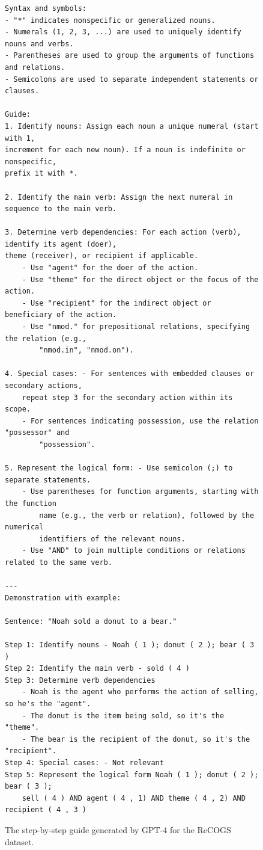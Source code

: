 \documentclass[11pt]{article}
\begin{document}
    \begin{figure}
        \small
        \begin{verbatim}
Syntax and symbols:
- "*" indicates nonspecific or generalized nouns.
- Numerals (1, 2, 3, ...) are used to uniquely identify nouns and verbs.
- Parentheses are used to group the arguments of functions and relations.
- Semicolons are used to separate independent statements or clauses.

Guide:
1. Identify nouns: Assign each noun a unique numeral (start with 1,
increment for each new noun). If a noun is indefinite or nonspecific,
prefix it with *.

2. Identify the main verb: Assign the next numeral in sequence to the main verb.

3. Determine verb dependencies: For each action (verb), identify its agent (doer),
theme (receiver), or recipient if applicable.
    - Use "agent" for the doer of the action.
    - Use "theme" for the direct object or the focus of the action.
    - Use "recipient" for the indirect object or beneficiary of the action.
    - Use "nmod." for prepositional relations, specifying the relation (e.g.,
        "nmod.in", "nmod.on").

4. Special cases: - For sentences with embedded clauses or secondary actions,
    repeat step 3 for the secondary action within its scope.
    - For sentences indicating possession, use the relation "possessor" and
        "possession".

5. Represent the logical form: - Use semicolon (;) to separate statements.
    - Use parentheses for function arguments, starting with the function
        name (e.g., the verb or relation), followed by the numerical
        identifiers of the relevant nouns.
    - Use "AND" to join multiple conditions or relations related to the same verb.

---
Demonstration with example:

Sentence: "Noah sold a donut to a bear."

Step 1: Identify nouns - Noah ( 1 ); donut ( 2 ); bear ( 3 )
Step 2: Identify the main verb - sold ( 4 )
Step 3: Determine verb dependencies
    - Noah is the agent who performs the action of selling, so he's the "agent".
    - The donut is the item being sold, so it's the "theme".
    - The bear is the recipient of the donut, so it's the "recipient".
Step 4: Special cases: - Not relevant
Step 5: Represent the logical form Noah ( 1 ); donut ( 2 ); bear ( 3 );
    sell ( 4 ) AND agent ( 4 , 1) AND theme ( 4 , 2) AND recipient ( 4 , 3 )
        \end{verbatim}
        \caption{The step-by-step guide generated by GPT-4 for the ReCOGS dataset.}
        \label{fig:recogs_guide}
    \end{figure}
\end{document}
